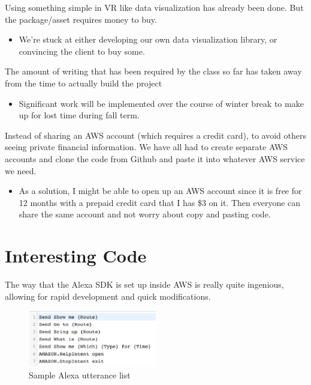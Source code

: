 \documentclass[onecolumn, draftclsnofoot,10pt, compsoc]{IEEEtran}
\begin{document}
    \vspace{10pt}
    
    Using something simple in VR like data visualization has already been done. But the package/asset requires money to buy. 
    
    \begin{itemize}
        \item We{'}re stuck at either developing our own data visualization library, or convincing the client to buy some. 
    \end{itemize}
    
    \vspace{10pt}
    
    The amount of writing that has been required by the class so far has taken away from the time to actually build the project
    
    \begin{itemize}
        \item Significant work will be implemented over the course of winter break to make up for lost time during fall term.
    \end{itemize}
    
    \vspace{10pt}
    
    Instead of sharing an AWS account (which requires a credit card), to avoid others seeing private financial information. We have all had to create separate AWS accounts and clone the code from Github and paste it into whatever AWS service we need. 
    
    \begin{itemize}
        \item As a solution, I might be able to open up an AWS account since it is free for 12 months with a prepaid credit card that I has \$3 on it. Then everyone can share the same account and not worry about copy and pasting code. 
    \end{itemize}



\section{Interesting Code}
    The way that the Alexa SDK is set up inside AWS is really quite ingenious, allowing for rapid development and quick modifications.

    \begin{figure}
        \centering
        \includegraphics[width=0.5\textwidth]{alexa-phrases.eps}
        \caption{Sample Alexa utterance list}
        \label{fig:alexa}
    \end{figure}
\end{document}
